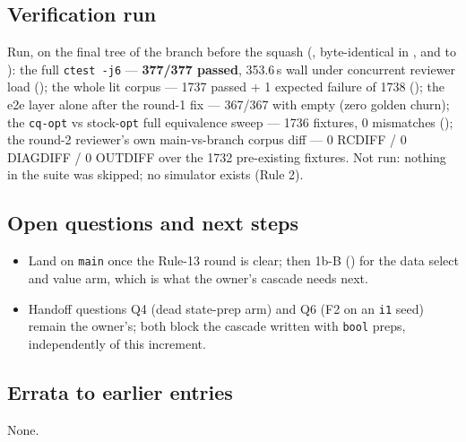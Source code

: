 \subsection*{Verification run}
Run, on the final tree of the branch before the squash (, byte-identical in
,  and  to ): the full \texttt{ctest -j6}
--- \textbf{377/377 passed}, 353.6\,s wall under concurrent reviewer load
(); the whole lit corpus --- 1737 passed + 1 expected
failure of 1738 (); the e2e layer alone after the round-1 fix ---
367/367 with  empty (zero golden churn);
the \texttt{cq-opt} vs stock-\texttt{opt} full equivalence sweep --- 1736 fixtures, 0 mismatches
(); the round-2 reviewer's own
main-vs-branch corpus diff --- 0 RCDIFF / 0 DIAGDIFF / 0 OUTDIFF over the 1732 pre-existing
fixtures. Not run: nothing in the suite was skipped; no simulator exists (Rule 2).

\subsection*{Open questions and next steps}
\begin{itemize}
  \item Land  on \texttt{main} once the Rule-13 round is clear; then 1b-B () for the
    data select and value arm, which is what the owner's cascade needs next.
  \item Handoff questions Q4 (dead state-prep arm) and Q6 (F2 on an \texttt{i1} seed) remain the owner's; both
    block the cascade written with \texttt{bool} preps, independently of this increment.
\end{itemize}

\subsection*{Errata to earlier entries}
None.
